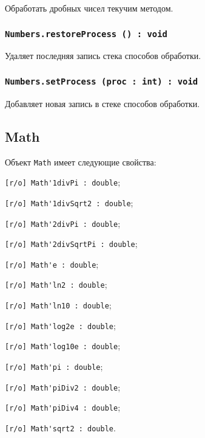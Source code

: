 Обработать дробных чисел текучим методом.

\subsubsection{\lstinline|Numbers.restoreProcess () : void|}

Удаляет последняя запись стека способов обработки.

\subsubsection{\lstinline|Numbers.setProcess (proc : int) : void|}

Добавляет новая запись в стеке способов обработки.

\subsection{{\color{orange} Math}}

Объект \lstinline|Math| имеет следующие свойства:
\begin{icItems}
	\item \lstinline|[r/o] Math'1divPi : double|;
	\item \lstinline|[r/o] Math'1divSqrt2 : double|;
	\item \lstinline|[r/o] Math'2divPi : double|;
	\item \lstinline|[r/o] Math'2divSqrtPi : double|;
	\item \lstinline|[r/o] Math'e : double|;
	\item \lstinline|[r/o] Math'ln2 : double|;
	\item \lstinline|[r/o] Math'ln10 : double|;
	\item \lstinline|[r/o] Math'log2e : double|;
	\item \lstinline|[r/o] Math'log10e : double|;
	\item \lstinline|[r/o] Math'pi : double|;
	\item \lstinline|[r/o] Math'piDiv2 : double|;
	\item \lstinline|[r/o] Math'piDiv4 : double|;
	\item \lstinline|[r/o] Math'sqrt2 : double|.
\end{icItems}

